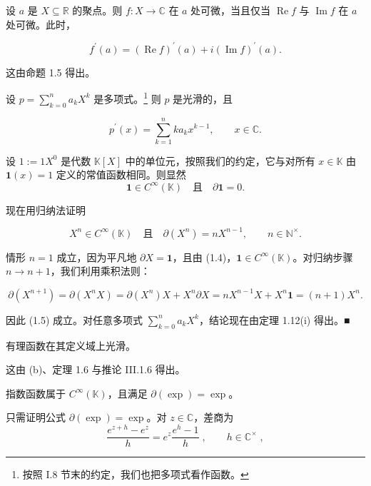 \begin{example}

\begin{items}
\item

设 $a$ 是 $X \subseteq \mathbb{R}$ 的聚点。则 $f: X \to \mathbb{C}$ 在 $a$ 处可微，当且仅当 $\operatorname{Re} f$ 与 $\operatorname{Im} f$ 在 $a$ 处可微。此时，

\[
f^{\prime}(a)=(\operatorname{R e}f)^{\prime}(a)+i(\operatorname{I m}f)^{\prime}(a).
\]

\proofhead
这由命题 1.5 得出。
\item

设 $ p = \sum_{k=0}^{n} a_k X^k $ 是多项式。\footnote{按照 I.8 节末的约定，我们也把多项式看作函数。} 则 $ p $ 是光滑的，且

\[
p^{\prime}(x)=\sum_{k=1}^{n}ka_{k}x^{k-1},\qquad x\in\mathbb{C}.
\]

\proofhead
设 $ 1 := 1X^0 $ 是代数 $ \mathbb{K}[X] $ 中的单位元，按照我们的约定，它与对所有 $ x \in \mathbb{K} $ 由 $ \mathbf{1}(x) = 1 $ 定义的常值函数相同。则显然
\begin{equation}
\mathbf{1}\in C^{\infty}(\mathbb{K})\quad\text{且}\quad\partial\mathbf{1}=0.
\end{equation}

现在用归纳法证明

\begin{equation}
X^{n}\in C^{\infty}(\mathbb{K})\quad\text{且}\quad\partial(X^{n})=n X^{n-1},\qquad n\in\mathbb{N}^{\times}.
\end{equation}

情形 $n=1$ 成立，因为平凡地 $\partial X = \mathbf{1}$，且由 (1.4)，$\mathbf{1} \in C^\infty(\mathbb{K})$。对归纳步骤 $n \to n+1$，我们利用乘积法则：

\[
\partial(X^{n+1})=\partial(X^{n}X)=\partial(X^{n})X+X^{n}\partial X=nX^{n-1}X+X^{n}\mathbf{1}=(n+1)X^{n}.
\]

因此 (1.5) 成立。对任意多项式 $ \sum_{k=0}^{n} a_k X^k $，结论现在由定理 1.12(i) 得出。■

\item

有理函数在其定义域上光滑。

\proofhead
这由 (b)、定理 1.6 与推论 III.1.6 得出。
\item

指数函数属于 $ C^\infty(\mathbb{K}) $，且满足 $ \partial(\exp) = \exp $。

\proofhead
只需证明公式 $ \partial(\exp) = \exp $。对 $ z \in \mathbb{C} $，差商为
\[
\frac{e^{z+h}-e^{z}}{h}=e^{z}\frac{e^{h}-1}{h}\;,\qquad h\in\mathbb{C}^{\times}\;,
\]


\end{items}
\end{example}
